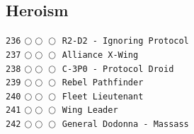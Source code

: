 \documentclass[a4paper,landscape]{article}
\begin{document}
\begin{multicols*}{5}
\section{Heroism} 
\vspace{-2mm} 
\texttt{236} \(\bigcirc\!\bigcirc\!\bigcirc\)  \texttt{R2-D2 - Ignoring Protocol} \vspace{-0.3mm}\\ 
\texttt{237} \(\bigcirc\!\bigcirc\!\bigcirc\)  \texttt{Alliance X-Wing} \vspace{-0.3mm}\\ 
\texttt{238} \(\bigcirc\!\bigcirc\!\bigcirc\)  \texttt{C-3P0 - Protocol Droid} \vspace{-0.3mm}\\ 
\texttt{239} \(\bigcirc\!\bigcirc\!\bigcirc\)  \texttt{Rebel Pathfinder} \vspace{-0.3mm}\\ 
\texttt{240} \(\bigcirc\!\bigcirc\!\bigcirc\)  \texttt{Fleet Lieutenant} \vspace{-0.3mm}\\ 
\texttt{241} \(\bigcirc\!\bigcirc\!\bigcirc\)  \texttt{Wing Leader} \vspace{-0.3mm}\\ 
\texttt{242} \(\bigcirc\!\bigcirc\!\bigcirc\)  \texttt{General Dodonna - Massass} \vspace{-0.3mm}\\ 

\end{multicols*}
\end{document}
